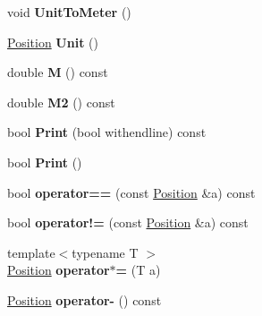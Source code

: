 \begin{DoxyCompactItemize}
\item 
\hypertarget{classPosition_af02152e9534534c2b21414ee26435da9}{
void {\bfseries UnitToMeter} ()}
\label{classPosition_af02152e9534534c2b21414ee26435da9}

\item 
\hypertarget{classPosition_aa795d01e1825aec571603081412aedab}{
\hyperlink{classPosition}{Position} {\bfseries Unit} ()}
\label{classPosition_aa795d01e1825aec571603081412aedab}

\item 
\hypertarget{classPosition_acc7380659f848eac5268337a893fd264}{
double {\bfseries M} () const }
\label{classPosition_acc7380659f848eac5268337a893fd264}

\item 
\hypertarget{classPosition_abc9a94774679003228dbb648f481a004}{
double {\bfseries M2} () const }
\label{classPosition_abc9a94774679003228dbb648f481a004}

\item 
\hypertarget{classPosition_a9e1f77cfa7961674ce9b3fed6488786d}{
bool {\bfseries Print} (bool withendline) const }
\label{classPosition_a9e1f77cfa7961674ce9b3fed6488786d}

\item 
\hypertarget{classPosition_a65491aa32b851bf35260a5d82a9735da}{
bool {\bfseries Print} ()}
\label{classPosition_a65491aa32b851bf35260a5d82a9735da}

\item 
\hypertarget{classPosition_aa89951f4ed590fe130ddad8e8809c49f}{
bool {\bfseries operator==} (const \hyperlink{classPosition}{Position} \&a) const }
\label{classPosition_aa89951f4ed590fe130ddad8e8809c49f}

\item 
\hypertarget{classPosition_a2c041236d9451b265b13d275fabde180}{
bool {\bfseries operator!=} (const \hyperlink{classPosition}{Position} \&a) const }
\label{classPosition_a2c041236d9451b265b13d275fabde180}

\item 
\hypertarget{classPosition_add258c9852b8fc1e14e73ae46dc3098f}{
{\footnotesize template$<$typename T $>$ }\\\hyperlink{classPosition}{Position} {\bfseries operator$\ast$=} (T a)}
\label{classPosition_add258c9852b8fc1e14e73ae46dc3098f}

\item 
\hypertarget{classPosition_a195ed1edccd36180b1b7c36025630d71}{
\hyperlink{classPosition}{Position} {\bfseries operator-\/} () const }
\label{classPosition_a195ed1edccd36180b1b7c36025630d71}


\end{DoxyCompactItemize}
